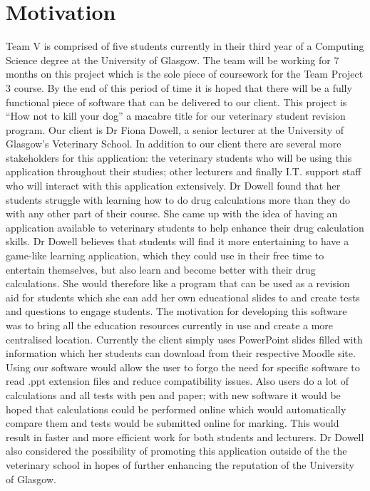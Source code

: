 \documentclass{l3proj}
\begin{document}
\section{Motivation}
Team V is comprised of five students currently in their third year of a Computing Science degree at the University of Glasgow. The team will be working for 7 months on this project which is the sole piece of coursework for the Team Project 3 course. By the end of this period of time it is hoped that there will be a fully functional piece of software that can be delivered to our client.
\newline
\newline
This project is ``How not to kill your dog'' a macabre title for our veterinary student revision program. Our client is Dr Fiona Dowell, a senior lecturer at the University of Glasgow's Veterinary School. In addition to our client there are several more stakeholders for this application: the veterinary students who will be using this application throughout their studies; other lecturers and finally I.T. support staff who will interact with this application extensively.  Dr Dowell found that her students struggle with learning how to do drug calculations more than they do with any other part of their course. She came up with the idea of having an application available to veterinary students to help enhance their drug calculation skills.
\newline
\newline
Dr Dowell believes that students will find it more entertaining to have a game-like learning application, which they could use in their free time to entertain themselves, but also learn and become better with their drug calculations. She would therefore like a program that can be used as a revision aid for students which she can add her own educational slides to and create tests and questions to engage students.
\newline
\newline
The motivation for developing this software was to bring all the education resources currently in use and create a more centralised location. Currently the client simply uses PowerPoint slides filled with information which her students can download from their respective Moodle site. Using our software would allow the user to forgo the need for specific software to read .ppt extension files and reduce compatibility issues. Also users do a lot of calculations and all tests with pen and paper; with new software it would be hoped that calculations could be performed online which would automatically compare them and tests would be submitted online for marking. This would result in faster and more efficient work for both students and lecturers. Dr Dowell also considered the possibility of promoting this application outside of the the veterinary school in hopes of further enhancing the reputation of the University of Glasgow.
\end{document}
